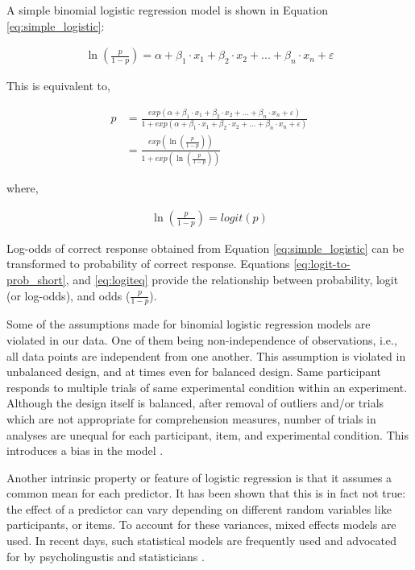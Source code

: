 \documentclass[a4paper, nobind]{templates/ociamthesis}
\begin{document}
A simple binomial logistic regression model is shown in Equation \ref{eq:simple_logistic}:

\begin{align} \label{eq:simple_logistic}
\ln(\frac{p}{1-p}) =
\alpha + 
\beta_{1}\cdot{x_1} + 
\beta_{2}\cdot{x_2} + ... +
\beta_{n}\cdot{x_n} + \varepsilon
\end{align}

This is equivalent to,

\begin{align} \label{eq:logit-to-prob_long}
p &=
{\frac{exp(\alpha + 
\beta_{1}\cdot{x_1} + 
\beta_{2}\cdot{x_2} + ... +
\beta_{n}\cdot{x_n} + \varepsilon)}
{1 + exp (\alpha + 
\beta_{1}\cdot{x_1} + 
\beta_{2}\cdot{x_2} + ... +
\beta_{n}\cdot{x_n} + \varepsilon)}}\\ \label{eq:logit-to-prob_short}
&= {\frac{exp(\ln(\frac{p}{1-p}))}{1 + exp (\ln(\frac{p}{1-p}))}}
\end{align}

where,

\begin{align} \label{eq:logiteq}
\ln(\frac{p}{1-p}) =
{logit}(p)
\end{align}

Log-odds of correct response obtained from Equation \ref{eq:simple_logistic} can be transformed to probability of correct response. Equations \ref{eq:logit-to-prob_short}, and \ref{eq:logiteq} provide the relationship between probability, logit (or log-odds), and odds (\(\frac{p}{1-p}\)).

Some of the assumptions made for binomial logistic regression models are violated in our data.
One of them being non-independence of observations, i.e., all data points are independent from one another.
This assumption is violated in unbalanced design, and at times even for balanced design.
Same participant responds to multiple trials of same experimental condition within an experiment.
Although the design itself is balanced, after removal of outliers and/or trials which are not appropriate for comprehension measures, number of trials in analyses are unequal for each participant, item, and experimental condition.
This introduces a bias in the model \autocite{Jaeger2008}.

Another intrinsic property or feature of logistic regression is that it assumes a common mean for each predictor.
It has been shown that this is in fact not true: the effect of a predictor can vary depending on different random variables like participants, or items.
To account for these variances, mixed effects models are used.
In recent days, such statistical models are frequently used and advocated for by psycholingustis and statisticians \autocite{Gries2015,Meteyard2020}.
\end{document}
